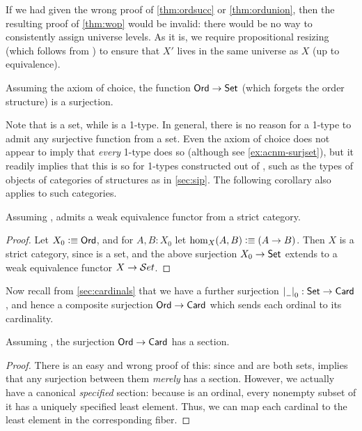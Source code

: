 \begin{rmk}
  If we had given the wrong proof of \autoref{thm:ordsucc} or \autoref{thm:ordunion}, then the resulting proof of \autoref{thm:wop} would be invalid: there would be no way to consistently assign universe levels.
  As it is, we require propositional resizing (which follows from \LEM{}) to ensure that $X'$ lives in the same universe as $X$ (up to equivalence).
\end{rmk}

\begin{cor}
  Assuming the axiom of choice, the function $\mathsf{Ord}\to\mathsf{Set}$ (which forgets the order structure) is a surjection.
\end{cor}

Note that \ord is a set, while \set is a 1-type.
In general, there is no reason for a 1-type to admit any surjective function from a set.
Even the axiom of choice does not appear to imply that \emph{every} 1-type does so (although see \autoref{ex:acnm-surjset}), but it readily implies that this is so for 1-types constructed out of \set, such as the types of objects of categories of structures as in \autoref{sec:sip}.
The following corollary also applies to such categories.

\begin{cor}
  Assuming \choice{}, \uset admits a weak equivalence functor from a strict category.
\end{cor}
\begin{proof}
  Let $X_0\vcentcolon\equiv \mathsf{Ord}$, and for $A,B:X_0$ let $\hom_X(A,B) \vcentcolon\equiv (A\to B)$.
  Then $X$ is a strict category, since \ord is a set, and the above surjection $X_0 \to \mathsf{Set}$ extends to a weak equivalence functor $X\to \mathcal{S}et$.
\end{proof}

Now recall from \autoref{sec:cardinals} that we have a further surjection $\mathopen{}\left|\mathord{\hspace{1pt}\underline{\hspace{1ex}}\hspace{1pt}}\right|_{0}^{}\mathclose{}:\mathsf{Set}\to\mathsf{Card}$, and hence a composite surjection $\mathsf{Ord}\to\mathsf{Card}$ which sends each ordinal to its cardinality.

\begin{thm}
  Assuming \choice{}, the surjection $\mathsf{Ord}\to\mathsf{Card}$ has a section.
\end{thm}
\begin{proof}
  There is an easy and wrong proof of this: since \ord and \card are both sets, \choice{} implies that any surjection between them \emph{merely} has a section.
  However, we actually have a canonical \emph{specified} section: because \ord is an ordinal, every nonempty subset of it has a uniquely specified least element.
  Thus, we can map each cardinal to the least element in the corresponding fiber.
\end{proof}

